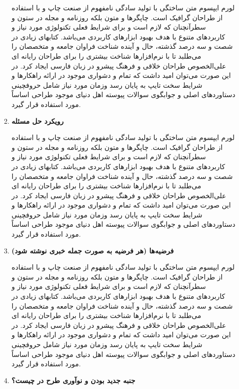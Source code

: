 \documentclass[letterpaper,11pt]{article}
\begin{document}
\begin{enumerate}
\begin{enumerate}
\begin{mdframed}[leftmargin=10pt,rightmargin=10pt]
لورم ایپسوم متن ساختگی با تولید سادگی نامفهوم از صنعت چاپ و با استفاده از طراحان گرافیک است. چاپگرها و متون بلکه روزنامه و مجله در ستون و سطرآنچنان که لازم است و برای شرایط فعلی تکنولوژی مورد نیاز و کاربردهای متنوع با هدف بهبود ابزارهای کاربردی می‌باشد. کتابهای زیادی در شصت و سه درصد گذشته، حال و آینده شناخت فراوان جامعه و متخصصان را می‌طلبد تا با نرم‌افزارها شناخت بیشتری را برای طراحان رایانه ای علی‌الخصوص طراحان خلاقی و فرهنگ پیشرو در زبان فارسی ایجاد کرد. در این صورت می‌توان امید داشت که تمام و دشواری موجود در ارائه راهکارها و شرایط سخت تایپ به پایان رسد وزمان مورد نیاز شامل حروفچینی دستاوردهای اصلی و جوابگوی سوالات پیوسته اهل دنیای موجود طراحی اساساً مورد استفاده قرار گیرد.
\end{mdframed}
  \item \textbf{رویکرد حل مسئله}
\begin{mdframed}[leftmargin=10pt,rightmargin=10pt]
لورم ایپسوم متن ساختگی با تولید سادگی نامفهوم از صنعت چاپ و با استفاده از طراحان گرافیک است. چاپگرها و متون بلکه روزنامه و مجله در ستون و سطرآنچنان که لازم است و برای شرایط فعلی تکنولوژی مورد نیاز و کاربردهای متنوع با هدف بهبود ابزارهای کاربردی می‌باشد. کتابهای زیادی در شصت و سه درصد گذشته، حال و آینده شناخت فراوان جامعه و متخصصان را می‌طلبد تا با نرم‌افزارها شناخت بیشتری را برای طراحان رایانه ای علی‌الخصوص طراحان خلاقی و فرهنگ پیشرو در زبان فارسی ایجاد کرد. در این صورت می‌توان امید داشت که تمام و دشواری موجود در ارائه راهکارها و شرایط سخت تایپ به پایان رسد وزمان مورد نیاز شامل حروفچینی دستاوردهای اصلی و جوابگوی سوالات پیوسته اهل دنیای موجود طراحی اساساً مورد استفاده قرار گیرد.
\end{mdframed}
  \item \textbf{فرضیه‌ها (هر فرضیه به صورت جمله خبری نوشته شود)}
\begin{mdframed}[leftmargin=10pt,rightmargin=10pt]
لورم ایپسوم متن ساختگی با تولید سادگی نامفهوم از صنعت چاپ و با استفاده از طراحان گرافیک است. چاپگرها و متون بلکه روزنامه و مجله در ستون و سطرآنچنان که لازم است و برای شرایط فعلی تکنولوژی مورد نیاز و کاربردهای متنوع با هدف بهبود ابزارهای کاربردی می‌باشد. کتابهای زیادی در شصت و سه درصد گذشته، حال و آینده شناخت فراوان جامعه و متخصصان را می‌طلبد تا با نرم‌افزارها شناخت بیشتری را برای طراحان رایانه ای علی‌الخصوص طراحان خلاقی و فرهنگ پیشرو در زبان فارسی ایجاد کرد. در این صورت می‌توان امید داشت که تمام و دشواری موجود در ارائه راهکارها و شرایط سخت تایپ به پایان رسد وزمان مورد نیاز شامل حروفچینی دستاوردهای اصلی و جوابگوی سوالات پیوسته اهل دنیای موجود طراحی اساساً مورد استفاده قرار گیرد.
\end{mdframed}
  \item \textbf{جنبه جدید بودن و نوآوری طرح در چیست؟} \newline

\end{enumerate}
\end{enumerate}
\end{document}
